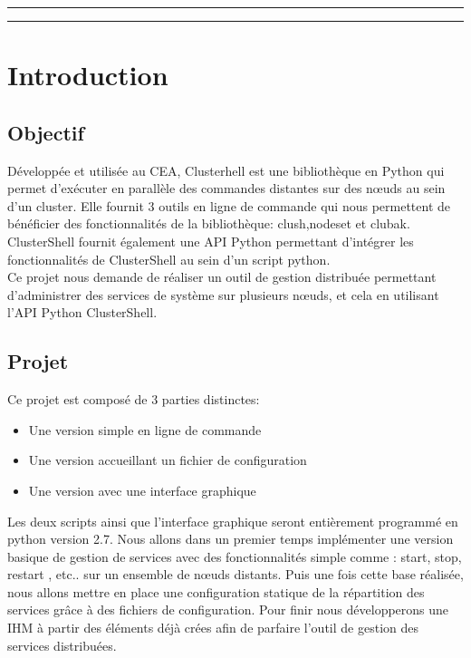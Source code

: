 \documentclass[a4paper,11pt]{article}
\begin{document}
\clearpage

\hrule\medskip

\begin{center}
  \tableofcontents
\end{center}

\medskip\hrule\bigskip\bigskip
\clearpage

\section{Introduction}
\label{sec:section1}
\subsection{Objectif}
\label{sub:1.1}
Développée et utilisée au CEA, Clusterhell est une bibliothèque en Python qui permet d'exécuter en parallèle des commandes distantes sur des nœuds au sein d'un cluster. Elle fournit 3 outils en ligne de commande qui nous permettent de bénéficier des fonctionnalités de la bibliothèque: clush,nodeset et clubak. ClusterShell fournit également une API Python permettant d'intégrer les fonctionnalités de ClusterShell au sein d'un script python.
\\
Ce projet nous demande de réaliser un outil de gestion distribuée permettant d'administrer des services de système sur plusieurs nœuds, et cela en utilisant l'API Python ClusterShell.
\\


\subsection{Projet}
\label{sub:1.2}

Ce projet est composé de 3 parties distinctes:
\begin{itemize}
\item Une version simple en ligne de commande
\item Une version accueillant un fichier de configuration
\item Une version avec une interface graphique
\end{itemize}
\bigbreak

Les deux scripts ainsi que l'interface graphique seront entièrement programmé en python version 2.7.
\smallbreak
Nous allons dans un premier temps implémenter une version basique de gestion de services avec des fonctionnalités simple comme : start, stop, restart , etc.. sur un ensemble de nœuds distants. Puis une fois cette base réalisée, nous allons mettre en place une configuration statique de la répartition des services grâce à des fichiers de configuration. Pour finir nous développerons une IHM à partir des éléments déjà crées afin de parfaire l'outil de gestion des services distribuées.
\pagebreak
\end{document}
